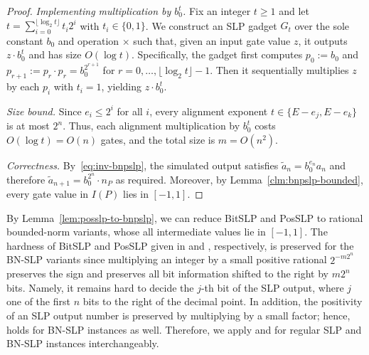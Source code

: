 \documentclass{article}
\theoremstyle{plain}
\theoremstyle{definition}
\theoremstyle{remark}
\begin{document}
\begin{proof}
	\smallskip
	\noindent\emph{Implementing multiplication by $b_0^t$.}
	Fix an integer $t\ge 1$ and let $t=\sum_{i=0}^{\lfloor \log_2 t\rfloor} t_i 2^i$ with $t_i\in\{0,1\}$.
	We construct an SLP gadget $G_t$ over the sole constant $b_0$ and operation $\times$ such that,
	given an input gate value $z$, it outputs $z\cdot b_0^t$ and has size $O(\log t)$.
	Specifically, the gadget first computes $p_0:=b_0$ and
	$p_{r+1}:=p_r\cdot p_r=b_0^{2^{r+1}}$ for $r=0,\ldots,\lfloor \log_2 t\rfloor-1$.
	Then it sequentially multiplies $z$ by each $p_i$ with $t_i=1$, yielding $z\cdot b_0^t$.
	
	\smallskip
	\noindent\emph{Size bound.}
    Since $e_i\le 2^i$
	for all $i$, every alignment exponent
	$t\in\{E-e_j,E-e_k\}$ is at most $2^n$.
    Thus, each alignment multiplication by
	$b_0^t$ costs $O(\log t)=O(n)$ gates, and the total size is $m = O(n^2)$.
	
	\smallskip
	\noindent\emph{Correctness.}
	By~\eqref{eq:inv-bnpslp}, the simulated output satisfies
	$\tilde a_n = b_0^{e_n} a_n$ and therefore $\tilde a_{n+1} = b_0^{2^n} \cdot n_P$ as required. 
    Moreover, by Lemma~\ref{clm:bnpslp-bounded}, every gate value in $I(P)$ lies in $[-1,1]$.
\end{proof}




By Lemma~\ref{lem:posslp-to-bnpslp}, we can reduce BitSLP and PosSLP to rational bounded-norm variants, whose all intermediate values lie in $[-1,1]$. The hardness of BitSLP and PosSLP given in  and , respectively, is preserved for the BN-SLP variants since multiplying an integer by a small positive rational $2^{-m 2^n}$ preserves the sign and preserves all bit information shifted to the right by $m 2^n$ bits. Namely, it remains hard to decide the $j$-th bit of the SLP output, where $j$ one of the first $n$ bits to the right of the decimal point.
In addition, the positivity of an SLP output number is preserved by multiplying by a small factor; hence,  holds for BN-SLP instances as well. Therefore, we apply  and  for regular SLP and BN-SLP instances interchangeably.
\end{document}
